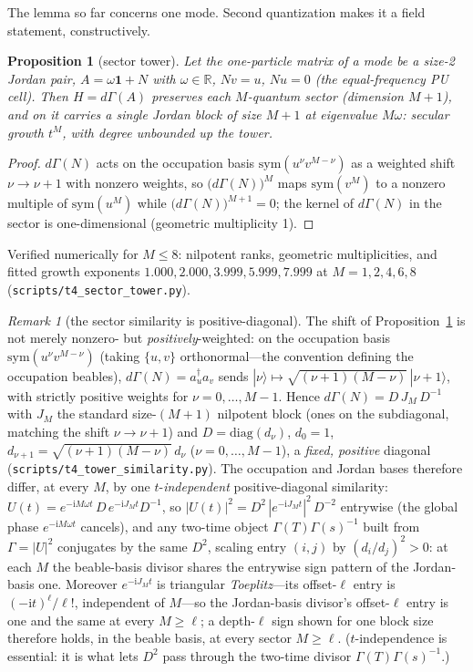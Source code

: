 \documentclass[11pt]{article}
\newtheorem{proposition}[theorem]{Proposition}
\theoremstyle{definition}
\theoremstyle{remark}
\newtheorem{remark}[theorem]{Remark}
\newcommand{\ii}{\mathrm{i}}
\begin{document}
The lemma so far concerns one mode. Second quantization makes it a
field statement, constructively.

\begin{proposition}[sector tower]
\label{prop:tower}
Let the one-particle matrix of a mode be a size-2 Jordan pair,
$A=\omega\mathbf 1+N$ with $\omega\in\mathbb R$, $Nv=u$, $Nu=0$
(the equal-frequency PU
cell). Then $H=d\Gamma(A)$ preserves each $M$-quantum sector
(dimension $M{+}1$), and on it carries a \emph{single} Jordan block
of size $M{+}1$ at eigenvalue $M\omega$: secular growth $t^{M}$,
with degree unbounded up the tower.
\end{proposition}

\begin{proof}
$d\Gamma(N)$ acts on the occupation basis
$\mathrm{sym}(u^{\nu}v^{M-\nu})$ as a weighted shift $\nu\to \nu+1$ with
nonzero weights, so $\bigl(d\Gamma(N)\bigr)^{M}$ maps
$\mathrm{sym}(v^{M})$ to a nonzero multiple of
$\mathrm{sym}(u^{M})$ while $\bigl(d\Gamma(N)\bigr)^{M+1}=0$; the
kernel of $d\Gamma(N)$ in the sector is one-dimensional (geometric
multiplicity 1).
\end{proof}
Verified numerically for $M\le8$: nilpotent ranks,
geometric multiplicities, and fitted growth exponents
$1.000,2.000,3.999,5.999,7.999$ at $M=1,2,4,6,8$
(\texttt{scripts/t4\_sector\_tower.py}).

\begin{remark}[the sector similarity is positive-diagonal]
\label{rem:posdiag}
The shift of Proposition~\ref{prop:tower} is not merely nonzero- but
\emph{positively}-weighted: on the occupation basis $\mathrm{sym}(u^{\nu}v^{M-\nu})$
(taking $\{u,v\}$ orthonormal---the convention defining the occupation beables),
$d\Gamma(N)=a_{u}^{\dagger}a_{v}$ sends
$|\nu\rangle\mapsto\sqrt{(\nu{+}1)(M{-}\nu)}\,|\nu{+}1\rangle$, with strictly positive
weights for $\nu=0,\dots,M{-}1$. Hence $d\Gamma(N)=D\,J_{M}\,D^{-1}$ with $J_{M}$
the standard size-$(M{+}1)$ nilpotent block (ones on the subdiagonal, matching
the shift $\nu\to \nu{+}1$) and $D=\mathrm{diag}(d_{\nu})$, $d_{0}=1$,
$d_{\nu+1}=\sqrt{(\nu{+}1)(M{-}\nu)}\,d_{\nu}$ ($\nu=0,\dots,M{-}1$), a \emph{fixed,
positive} diagonal (\texttt{scripts/t4\_tower\_similarity.py}). The occupation
and Jordan bases therefore differ, at every $M$, by one $t$-\emph{independent}
positive-diagonal similarity: $U(t)=e^{-\ii M\omega t}\,D\,e^{-\ii J_{M}t}D^{-1}$,
so $|U(t)|^{2}=D^{2}\,|e^{-\ii J_{M}t}|^{2}\,D^{-2}$ entrywise (the global phase
$e^{-\ii M\omega t}$ cancels), and any two-time object $\Gamma(T)\Gamma(s)^{-1}$ built from
$\Gamma=|U|^{2}$ conjugates by the same $D^{2}$, scaling entry $(i,j)$ by
$(d_{i}/d_{j})^{2}>0$: at each $M$ the beable-basis divisor shares the entrywise
sign pattern of the Jordan-basis one. Moreover $e^{-\ii J_{M}t}$ is triangular
\emph{Toeplitz}---its offset-$\ell$ entry is $(-\ii t)^{\ell}/\ell!$, independent of
$M$---so the Jordan-basis divisor's offset-$\ell$ entry is one and the same at every
$M\ge \ell$; a depth-$\ell$ sign shown for one block size therefore holds, in the
beable basis, at every sector $M\ge \ell$. ($t$-independence is essential: it is what lets
$D^{2}$ pass through the two-time divisor $\Gamma(T)\Gamma(s)^{-1}$.)
\end{remark}
\end{document}

